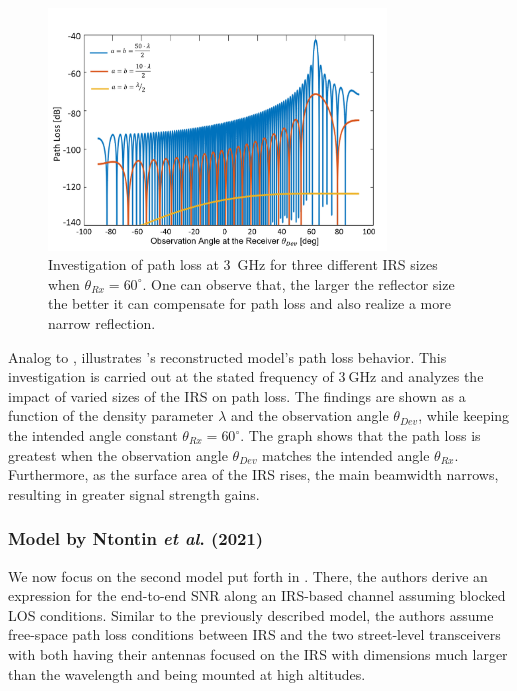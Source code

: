 \begin{figure}[tb] %
	\centering
	\vspace{8pt} %
	\includegraphics*[width=0.8\textwidth]{images/Section 2 Images/Model1-original}
	\caption{Investigation of path loss at \SI{3}{\giga\hertz} for three different IRS sizes when $\theta_{Rx}=60^{\circ}$. One can observe that, the larger the reflector size the better it can compensate for path loss and also realize a more narrow reflection.}
	\label{fig:model1_path loss} 
\end{figure}
Analog to \cite{8936989},  illustrates 's reconstructed model's path loss behavior. This investigation is carried out at the stated frequency of $\SI{3}{\giga\hertz}$ and analyzes the impact of varied sizes of the \ac{IRS} on path loss. The findings are shown as a function of the density parameter $\lambda$ and the observation angle $\theta_{Dev}$, while keeping the intended angle constant $\theta_{Rx}=60^{\circ}$. The graph shows that the path loss is greatest when the observation angle $\theta_{Dev}$ matches the intended angle $\theta_{Rx}$. Furthermore, as the surface area of the \ac{IRS} rises, the main beamwidth narrows, resulting in greater signal strength gains.
\subsubsection{Model by Ntontin \emph{et al}. (2021) \cite{ntontin2021optimal} }
\label{Model 2}
We now focus on the second model put forth in \cite{ntontin2021optimal}. There, the authors derive an expression for the end-to-end SNR along an IRS-based channel assuming blocked LOS conditions. Similar to the previously described model, the authors assume free-space path loss conditions between IRS and  the two street-level transceivers with both having their antennas focused on the IRS with dimensions much larger than the wavelength and being mounted at high altitudes.

